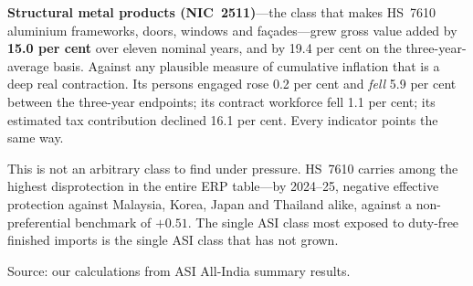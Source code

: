 \textbf{Structural metal products (NIC~2511)}---the class that makes HS~7610 aluminium frameworks, doors, windows and fa\c{c}ades---grew gross value added by \textbf{15.0 per cent} over eleven nominal years, and by 19.4 per cent on the three-year-average basis. Against any plausible measure of cumulative inflation that is a deep real contraction. Its persons engaged rose 0.2 per cent and \emph{fell} 5.9 per cent between the three-year endpoints; its contract workforce fell 1.1 per cent; its estimated tax contribution declined 16.1 per cent. Every indicator points the same way.

This is not an arbitrary class to find under pressure. HS~7610 carries among the highest disprotection in the entire ERP table---by 2024--25, negative effective protection against Malaysia, Korea, Japan and Thailand alike, against a non-preferential benchmark of $+0.51$. The single ASI class most exposed to duty-free finished imports is the single ASI class that has not grown.

\begin{table}[H]
    \centering
    \caption{Percentage change by NIC class, 2011--12 to 2022--23 (nominal)}
    \label{tab:asi_growth}

    \vspace{0.2cm}
    \raggedright
    \small Source: our calculations from ASI All-India summary results.
\end{table}

